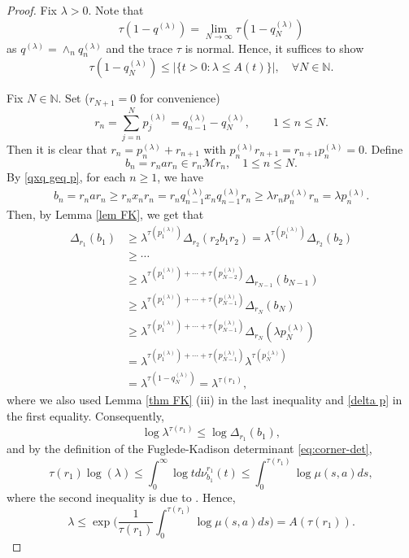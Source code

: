 \documentclass[11]{amsart}
\numberwithin{equation}{section}
\begin{document}
\begin{proof}
Fix $\lambda>0$. Note that 
	$$\tau(1-q^{(\lambda)})=\lim_{N\to\infty}\tau(1-q_N^{(\lambda)})$$
	as $q^{(\lambda)}=\wedge_n q_n^{(\lambda)}$ and the trace $\tau$ is normal. Hence, it suffices to show 
	$$\tau(1-q_N^{(\lambda)})\leq |\{t>0: \lambda\leq A(t)\}|,\quad \forall N\in\mathbb{N}. $$
	
	Fix $N\in \mathbb{N}$. Set ($r_{N+1}=0$ for convenience)
	\[r_n=\sum_{j=n}^{N}p_j^{(\lambda)}=q_{n-1}^{(\lambda)}-q_N^{(\lambda)},\qquad 1\leq n\leq N.\]
	Then it is clear that $r_n=p_n^{(\lambda)}+r_{n+1}$ with $p_n^{(\lambda)}r_{n+1}=r_{n+1}p_n^{(\lambda)}=0$. Define 
	\[b_n=r_nar_n\in r_n\mathcal{M}r_n,\quad 1\leq n\leq N.\]
By \eqref{qxq geq p}, for each $n\geq1$, we have
	\begin{align*}
		b_n=r_nar_n\geq r_n x_n r_n=r_n q_{n-1}^{(\lambda)}x_n q_{n-1}^{(\lambda)} r_n\geq \lambda r_n p_n^{(\lambda)} r_n=\lambda p_n^{(\lambda)}.	
	\end{align*}
	Then, by Lemma \ref{lem FK}, we get that 
	\begin{align*}
		\Delta_{r_1}(b_1)&\geq \lambda^{\tau(p_1^{(\lambda)})} \Delta_{r_2}(r_2b_1r_2)=\lambda^{\tau(p_1^{(\lambda)})} \Delta_{r_2}(b_2)\\
		&\geq \cdots\\
		&\geq \lambda^{\tau(p_1^{(\lambda)})+\cdots +\tau(p_{N-2}^{(\lambda)})} \Delta_{r_{N-1}}(b_{N-1})\\
		&\geq \lambda^{\tau(p_1^{(\lambda)})+\cdots +\tau(p_{N-1}^{(\lambda)})} \Delta_{r_N}(b_{N})\\
		&\geq \lambda^{\tau(p_1^{(\lambda)})+\cdots +\tau(p_{N-1}^{(\lambda)})} \Delta_{r_N}(\lambda p_{N}^{(\lambda)})\\
		&=\lambda^{\tau(p_1^{(\lambda)})+\cdots +\tau(p_{N-1}^{(\lambda)})} \lambda^{\tau(p_{N}^{(\lambda)})}\\
		&=\lambda^{\tau(1-q_N^{(\lambda)})}=\lambda^{\tau(r_1)},
	\end{align*}
	where we also used  Lemma \ref{thm FK} (iii) in the last inequality and \eqref{delta p} in the first equality. 
	Consequently, 
	$$\log \lambda^{\tau(r_1)}\leq \log 	\Delta_{r_1}(b_1),$$
	and by the definition of the Fuglede-Kadison determinant \eqref{eq:corner-det},
	\begin{equation*}
		\tau(r_1) \log(\lambda) \leq \int_0^{\infty}\log t d\nu_{b_1}^{r_1}(t)\leq  \int_0^{\tau(r_1)}\log \mu(s,a) ds,
	\end{equation*}
where the second inequality is due to  \cite{Fa1986}.  Hence,
	\begin{equation}\label{A lambda}
		\lambda \leq \exp\Big(\frac{1}{\tau(r_1)}\int_0^{\tau(r_1)}\log \mu(s,a) ds\Big)=A(\tau(r_1)). 
	\end{equation}
	

\end{proof}
\end{document}
